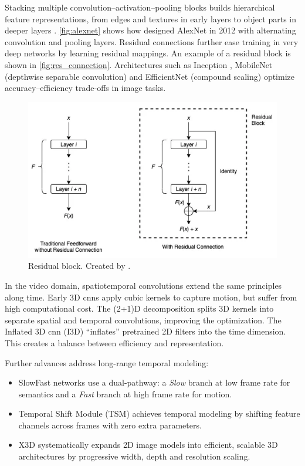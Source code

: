 Stacking multiple convolution–activation–pooling blocks builds hierarchical feature representations, from edges and textures in early layers to object parts in deeper layers \cite{lecun_deep_learning_2015}. \autoref{fig:alexnet} shows how \textcite{krizhevsky_alexnet} designed AlexNet in 2012 with alternating convolution and pooling layers. Residual connections \cite{he_deep_residual_2015} further ease training in very deep networks by learning residual mappings. An example of a residual block is shown in \autoref{fig:res_connection}. Architectures such as Inception \cite{szegedy_going_2014}, MobileNet (depthwise separable convolution) \cite{howard_mobilenets_2017} and EfficientNet (compound scaling) \cite{tan_efficientnet_2020} optimize accuracy–efficiency trade-offs in image tasks. 

\begin{figure}
    \centering
    \includegraphics[width=0.5\linewidth]{figures/res_connection.png} 
    \caption{Residual block. Created by \textcite{wong_what_is_residual_2022}. }
    \label{fig:res_connection}
\end{figure}

In the video domain, spatiotemporal convolutions extend the same principles along time.  Early 3D \acrshort{cnn}s \cite{tran_learning_2015} apply cubic kernels to capture motion, but suffer from high computational cost.  The (2+1)D decomposition \cite{tran_2_plus_1_convolution} splits 3D kernels into separate spatial and temporal convolutions, improving the optimization.  The Inflated 3D \acrshort{cnn} (I3D) \cite{carreira_2017_i3d_quo_vadis} “inflates” pretrained 2D filters into the time dimension. This creates a balance between efficiency and representation.

Further advances address long-range temporal modeling:
\begin{itemize}
    \item SlowFast networks \cite{feichtenhofer_slowfast_2019} use a dual-pathway: a \emph{Slow} branch at low frame rate for semantics and a \emph{Fast} branch at high frame rate for motion.  
    \item Temporal Shift Module (TSM) \cite{lin_temporal_shift_2019} achieves temporal modeling by shifting feature channels across frames with zero extra parameters.  
    \item X3D \cite{feichtenhofer_x3d_2020} systematically expands 2D image models into efficient, scalable 3D architectures by progressive width, depth and resolution scaling.
\end{itemize}


